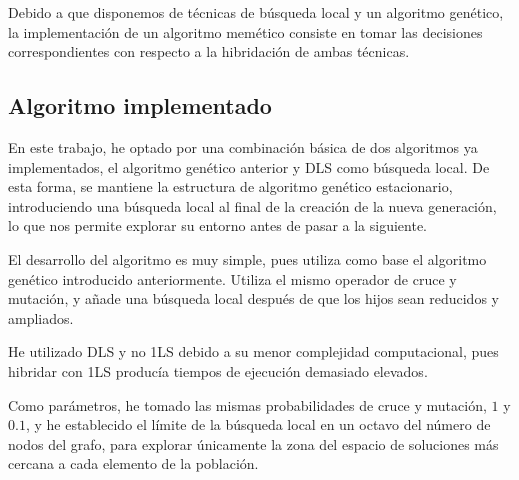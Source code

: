 Debido a que disponemos de técnicas de búsqueda local y un algoritmo genético, la
implementación de un algoritmo memético consiste en tomar las decisiones correspondientes
con respecto a la hibridación de ambas técnicas.

\subsection{Algoritmo implementado}\label{alg-memetico}

En este trabajo, he optado por una combinación básica de dos algoritmos ya implementados,
el algoritmo genético anterior y DLS como búsqueda local. De esta forma, se mantiene
la estructura de algoritmo genético estacionario, introduciendo una búsqueda local
al final de la creación de la nueva generación, lo que nos permite explorar su entorno
antes de pasar a la siguiente.

El desarrollo del algoritmo es muy simple, pues utiliza como base el algoritmo
genético introducido anteriormente. Utiliza el mismo operador de cruce y mutación,
y añade una búsqueda local después de que los hijos sean reducidos y ampliados.

He utilizado DLS y no 1LS debido a su menor complejidad computacional, pues hibridar
con 1LS producía tiempos de ejecución demasiado elevados.

Como parámetros, he tomado las mismas probabilidades de cruce y mutación, $1$ y $0.1$,
y he establecido el límite de la búsqueda local en un octavo del número de nodos
del grafo, para explorar únicamente la zona del espacio de soluciones más cercana
a cada elemento de la población.
